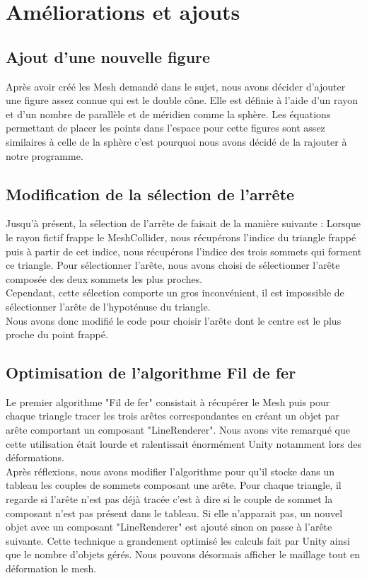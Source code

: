 \documentclass[a4paper,oneside,12pt,titlepage]{article}
\begin{document}
\section{Améliorations et ajouts}

\subsection{Ajout d'une nouvelle figure}
Après avoir créé les Mesh demandé dans le sujet, nous avons décider d'ajouter une figure assez connue qui est le double cône. Elle est définie à l'aide d'un rayon et d'un nombre de parallèle et de méridien comme la sphère. Les équations permettant de placer les points dans l'espace pour cette figures sont assez similaires à celle de la sphère c'est pourquoi nous avons décidé de la rajouter à notre programme. 

\subsection{Modification de la sélection de l'arrête}
Jusqu'à présent, la sélection de l'arrête de faisait de la manière suivante : Lorsque le rayon fictif frappe le MeshCollider, nous récupérons l'indice du triangle frappé puis à partir de cet indice, nous récupérons l'indice des trois sommets qui forment ce triangle. Pour sélectionner l'arête, nous avons choisi de sélectionner l'arête composée des deux sommets les plus proches. 
\\Cependant, cette sélection comporte un gros inconvénient, il est impossible de sélectionner l'arête de l'hypoténuse du triangle. \\
Nous avons donc modifié le code pour choisir l'arête dont le centre est le plus proche du point frappé.

\subsection{Optimisation de l'algorithme Fil de fer}

Le premier algorithme "Fil de fer" consistait à récupérer le Mesh puis pour chaque triangle tracer les trois arêtes correspondantes en créant un objet par arête comportant un composant "LineRenderer". Nous avons vite remarqué que cette utilisation était lourde et ralentissait énormément Unity notamment lors des déformations. \\
Après réflexions, nous avons modifier l'algorithme pour qu'il stocke dans un tableau les couples de sommets composant une arête. Pour chaque triangle, il regarde si l'arête n'est pas déjà tracée c'est à dire si le couple de sommet la composant n'est pas présent dans le tableau. Si elle n'apparait pas, un nouvel objet avec un composant "LineRenderer" est ajouté sinon on passe à l'arête suivante. Cette technique a grandement optimisé les calculs fait par Unity ainsi que le nombre d'objets gérés. Nous pouvons désormais afficher le maillage tout en déformation le mesh.
\end{document}
